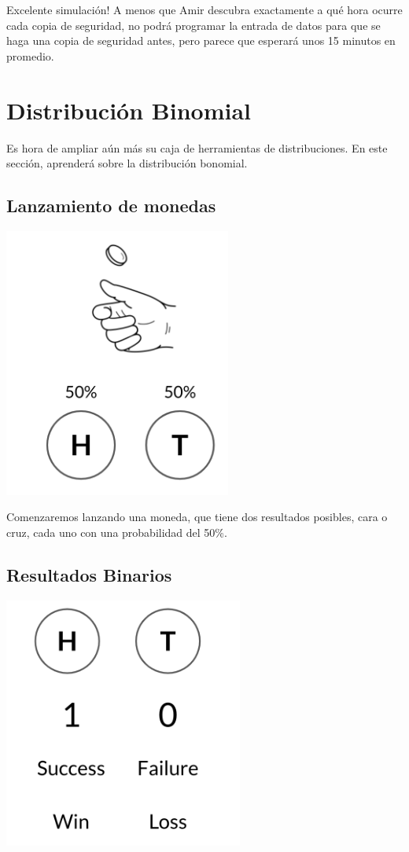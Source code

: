 \documentclass[
  letterpaper,
  DIV=11,
  numbers=noendperiod]{scrreprt}
\begin{document}
Excelente simulación! A menos que Amir descubra exactamente a qué hora
ocurre cada copia de seguridad, no podrá programar la entrada de datos
para que se haga una copia de seguridad antes, pero parece que esperará
unos 15 minutos en promedio.

\hypertarget{distribuciuxf3n-binomial}{%
\section{Distribución Binomial}\label{distribuciuxf3n-binomial}}

Es hora de ampliar aún más su caja de herramientas de distribuciones. En
este sección, aprenderá sobre la distribución bonomial.

\hypertarget{lanzamiento-de-monedas}{%
\subsection{Lanzamiento de monedas}\label{lanzamiento-de-monedas}}

\includegraphics{fig40.png}

Comenzaremos lanzando una moneda, que tiene dos resultados posibles,
cara o cruz, cada uno con una probabilidad del 50\%.

\hypertarget{resultados-binarios}{%
\subsection{Resultados Binarios}\label{resultados-binarios}}

\includegraphics{fig41.png}
\end{document}

